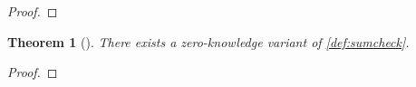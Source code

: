 \documentclass[english]{reedthesis}
\theoremstyle{plain}
\newtheorem{thm}{Theorem}[section]
\theoremstyle{definition}
\theoremstyle{remark}
\DeclarePairedDelimiter{\abs}{\lvert}{\rvert}
\newcommand{\middlemid}{%
  \ensuremath{\;\middle\vert\;}
}
\begin{document}

\begin{proof}
\end{proof}

\begin{thm}[{\cite{CFGS22}}]\label{thm:zk-sumcheck}
  There exists a zero-knowledge variant of \cref{def:sumcheck}.
\end{thm}

\begin{proof}
\end{proof}
\end{document}
